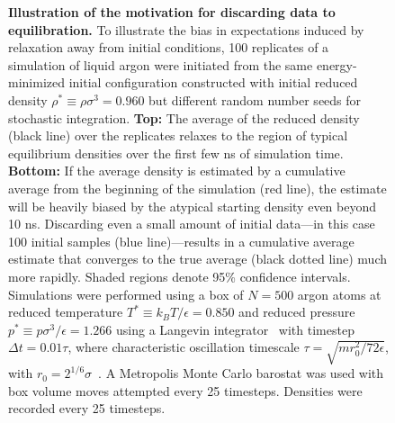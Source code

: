 \documentclass[aps,pre,twocolumn,nofootinbib,superscriptaddress,linenumbers,11point]{revtex4-1}
\begin{document}

\begin{figure} 
\caption{\label{figure:burn-in-example} {\bf Illustration of the motivation for discarding data to equilibration.} 
To illustrate the bias in expectations induced by relaxation away from initial conditions, 100 replicates of a simulation of liquid argon were initiated from the same energy-minimized initial configuration constructed with initial reduced density $\rho^* \equiv \rho \sigma^3 = 0.960$ but different random number seeds for stochastic integration.
%
{\bf Top:} The average of the reduced density (black line) over the replicates relaxes to the region of typical equilibrium densities over the first few ns of simulation time.
%
{\bf Bottom:} If the average density is estimated by a cumulative average from the beginning of the simulation (red line), the estimate will be heavily biased by the atypical starting density even beyond 10 ns.
Discarding even a small amount of initial data---in this case 100 initial samples (blue line)---results in a cumulative average estimate that converges to the true average (black dotted line) much more rapidly.
% 
Shaded regions denote 95\% confidence intervals.
%
Simulations were performed using a box of $N = 500$ argon atoms at reduced temperature $T^* \equiv k_B T / \epsilon = 0.850$ and reduced pressure $p^* \equiv p \sigma^3 / \epsilon = 1.266$ using a Langevin integrator~\cite{sivak-chodera-crooks:jpcb:2014:vvvr} with timestep $\Delta t = 0.01 \tau$, where characteristic oscillation timescale $\tau = \sqrt{m r_0^2 / 72 \epsilon}$, with $r_0 = 2^{1/6} \sigma$~\cite{liquid-argon-characteristic-timescale}.
A Metropolis Monte Carlo barostat was used with box volume moves attempted every 25 timesteps.
Densities were recorded every 25 timesteps.
}
\end{figure}
\end{document}
